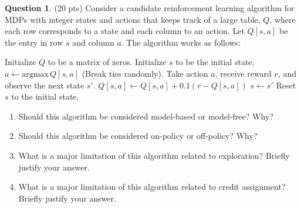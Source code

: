 \documentclass{article}
\theoremstyle{definition}
\newtheorem{question}[thm]{Question}
\begin{document}
\clearpage

\begin{question} (20 pts)
    Consider a candidate reinforcement learning algorithm for MDPs with integer states and actions that keeps track of a large table, $Q$, where each row corresponds to a state and each column to an action. Let $Q[s, a]$ be the entry in row $s$ and column $a$.
    The algorithm works as follows: 
    \\
    \begin{algorithmic}[1]
        \State Initialize $Q$ to be a matrix of zeros.
        \State Initialize $s$ to be the initial state.
        \Loop
            \State $a \gets \text{argmax}\, Q[s, a]$ (Break ties randomly).
            \State Take action $a$, receive reward $r$, and observe the next state $s'$.
            \State $Q[s, a] \gets Q[s, a] + 0.1 (r - Q[s, a])$
            \State $s \gets s'$
                \State Reset $s$ to the initial state.
            \EndIf
        \EndLoop
    \end{algorithmic}

    \begin{enumerate}[label=(\alph*)]
        \item Should this algorithm be considered model-based or model-free? Why?
        \item Should this algorithm be considered on-policy or off-policy? Why?
        \item What is a major limitation of this algorithm related to exploration? Briefly justify your answer.
        \item What is a major limitation of this algorithm related to credit assignment? Briefly justify your answer.
    \end{enumerate}
\end{question}
\end{document}

